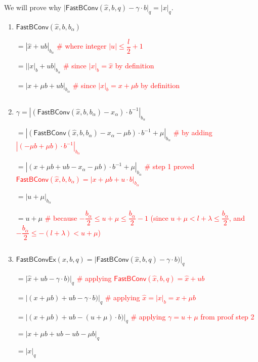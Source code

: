 We will prove why $\Big|\textsf{FastBConv}(\hat{x}, b, q) - \gamma \cdot b\Big|_q = |x|_q$. 

\begin{myproof}



\begin{enumerate}



\item $\textsf{FastBConv}(\hat{x}, b, b_\alpha) $%

$ = |\hat{x} + ub|_{b_\alpha}$ \textcolor{red}{ \# where integer $|u| \leq \dfrac{l}{2}+1$}

$ = \Big||x|_{b} + ub\Big|_{b_\alpha}$ \textcolor{red}{ \# since $|x|_{b} = \hat{x}$ by definition}

$ = |x + \mu b + ub|_{b_\alpha}$ \textcolor{red}{ \# since $|x|_{b} = x + \mu b$ by definition}

$ $

\item $\gamma = |(\textsf{FastBConv}(\hat{x}, b, b_\alpha) - x_\alpha)\cdot b^{-1}|_{b_\alpha}$

$ = |(\textsf{FastBConv}(\hat{x}, b, b_\alpha) - x_\alpha - \mu b)\cdot b^{-1} + \mu|_{b_\alpha} $ \textcolor{red}{ \# by adding $|(-\mu b + \mu b)\cdot b^{-1}|_{b_\alpha}$}

$ = |(x + \mu b + ub - x_\alpha - \mu b)\cdot b^{-1} + \mu|_{b_\alpha} $ \textcolor{red}{ \# step 1 proved $ \textsf{FastBConv}(\hat{x}, b, b_\alpha) = |x + \mu b + u\cdot b|_{b_\alpha}$}

$ = |u + \mu|_{b_\alpha} $

$ = u + \mu $ \textcolor{red}{ \# because $-\dfrac{b_\alpha}{2} \leq u + \mu \leq \dfrac{b_\alpha}{2} - 1$ (since $u + \mu < l + \lambda \leq \dfrac{b_\alpha}{2}$, and $-\dfrac{b_\alpha}{2} \leq -(l+\lambda) < u + \mu$)}

$ $

\item $\textsf{FastBConvEx}(x, b, q) = \Big|\textsf{FastBConv}(\hat{x}, b, q) - \gamma \cdot b)\Big|_q $

$ = \Big|\hat{x} + u b - \gamma \cdot b)\Big|_q $ \textcolor{red}{ \# applying $\textsf{FastBConv}(\hat{x}, b, q) = \hat{x} + u b$ }

$ = \Big|(x + \mu b) + u b - \gamma \cdot b)\Big|_q $ \textcolor{red}{ \# applying $\hat{x} = |x|_b = x + \mu b$}

$ = \Big|(x + \mu b) + u b - (u + \mu) \cdot b)\Big|_q $ \textcolor{red}{ \# applying $\gamma = u + \mu$ from proof step 2}

$ = |x + \mu b + ub - ub - \mu b|_q $

$ = |x|_q $

\end{enumerate}

\end{myproof}

